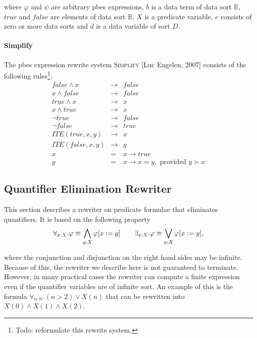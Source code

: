 \documentclass{article}
\begin{document}
where $\varphi $ and $\psi $ are arbitrary pbes expressions, $b$ is a data
term of data sort $\mathbb{B}$, $true$ and $false$ are elements of data sort
$\mathbb{B}$, $X$ is a predicate variable, $e$ consists of zero or more data
sorts and $d$ is a data variable of sort $D$.

\paragraph{\newpage Simplify}

The pbes expression rewrite system \textsc{Simplify} [Luc Engelen, 2007]
consists of the following rules\footnote{%
Todo: reformulate this rewrite system.}:%
\begin{eqnarray*}
false\wedge x &\rightarrow &false \\
x\wedge false &\rightarrow &false \\
true\wedge x &\rightarrow &x \\
x\wedge true &\rightarrow &x \\
\lnot true &\rightarrow &false \\
\lnot false &\rightarrow &true \\
ITE(true,x,y) &\rightarrow &x \\
ITE(false,x,y) &\rightarrow &y \\
x &=&x\rightarrow true \\
y &=&x\rightarrow x=y,\text{ provided }y\succ x
\end{eqnarray*}

\subsection{Quantifier Elimination Rewriter}

This section describes a rewriter on predicate formulae that eliminates
quantifiers. It is based on the following property%
\begin{equation*}
\begin{array}{cc}
\forall _{x:X}.\varphi \equiv \dbigwedge\limits_{y:X}\varphi \lbrack
x:=y]\quad & \exists _{x:X}.\varphi \equiv \dbigvee\limits_{y:X}\varphi
\lbrack x:=y],%
\end{array}%
\end{equation*}

where the conjunction and disjunction on the right hand sides may be
infinite. Because of this, the rewriter we describe here is not guaranteed
to terminate. However, in many practical cases the rewriter can compute a
finite expression even if the quantifier variables are of infinite sort. An
example of this is the formula $\forall _{n:\mathbb{N}}.(n>2)\vee X(n)$ that
can be rewritten into $X(0)\wedge X(1)\wedge X(2)$.
\end{document}
